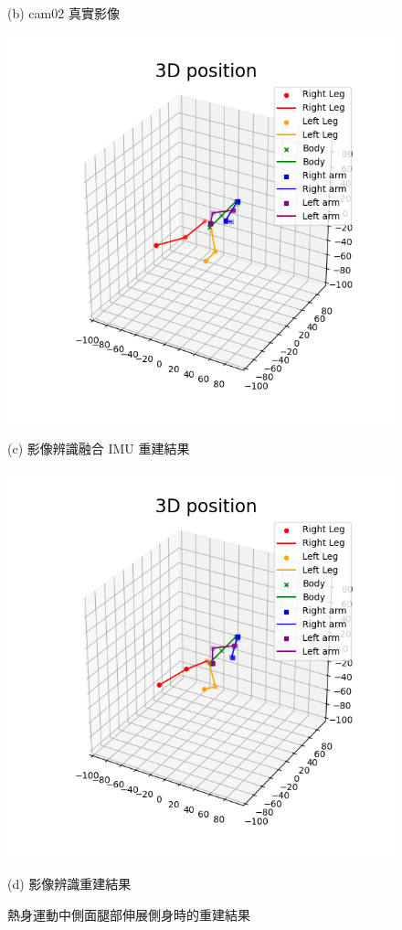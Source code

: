 \begin{figure}[!ht]
\begin{minipage}{.5\textwidth}
       \caption*{(b) cam02 真實影像}
    \end{minipage}
    \begin{minipage}{.5\textwidth}
       \centering
       \includegraphics[width=.95\linewidth]{figure/ch4_fig_warm_result_with2.png}
       \caption*{(c) 影像辨識融合 IMU 重建結果}
    \end{minipage}%
    \begin{minipage}{.5\textwidth}
       \centering
       \includegraphics[width=.95\linewidth]{figure/ch4_fig_warm_result_no2.png}
       \caption*{(d) 影像辨識重建結果}
    \end{minipage}
   \caption[熱身運動中側面腿部伸展側身時的重建結果]{熱身運動中側面腿部伸展側身時的重建結果}
   \label{ch4_fig_warm_side}
\end{figure}

